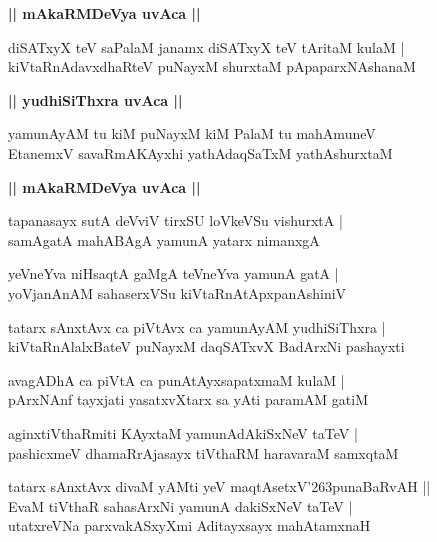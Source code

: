 \documentclass[twoside,12pt,openright]{book}
\def\S{\char'263}
\newcounter{shloka}[chapter]
\def\uvaca#1{\centerline{{\large\textbf{#1}}}}
\begin{document}
\uvaca{|| mAkaRMDeVya uvAca ||}

\begin{shloka}
diSATxyX teV saPalaM janamx diSATxyX teV tAritaM kulaM |\\
kiVtaRnAdavxdhaRteV puNayxM shurxtaM pApaparxNAshanaM 
\end{shloka}

\uvaca{|| yudhiSiThxra uvAca ||}

\begin{shloka}
yamunAyAM tu kiM puNayxM kiM PalaM tu mahAmuneV \\
EtanemxV savaRmAKAyxhi yathAdaqSaTxM yathAshurxtaM 
\end{shloka}

\uvaca{ || mAkaRMDeVya uvAca ||}

\begin{shloka}
tapanasayx sutA deVviV tirxSU loVkeVSu vishurxtA |\\
samAgatA mahABAgA yamunA yatarx nimanxgA 
\end{shloka}

\begin{shloka}
yeVneYva niHsaqtA gaMgA teVneYva yamunA gatA |\\
yoVjanAnAM sahaserxVSu kiVtaRnAtApxpanAshiniV 
\end{shloka}

\begin{shloka}
tatarx sAnxtAvx ca piVtAvx ca yamunAyAM yudhiSiThxra |\\
kiVtaRnAlalxBateV puNayxM daqSATxvX BadArxNi pashayxti
\end{shloka}

\begin{shloka}
avagADhA ca piVtA ca punAtAyxsapatxmaM kulaM |\\
pArxNAnf tayxjati yasatxvXtarx sa yAti paramAM gatiM 
\end{shloka}

\begin{shloka}
aginxtiVthaRmiti KAyxtaM yamunAdAkiSxNeV taTeV |\\
pashicxmeV dhamaRrAjasayx tiVthaRM haravaraM samxqtaM 
\end{shloka}

\begin{shloka}
tatarx sAnxtAvx divaM yAMti yeV maqtAsetxV\S punaBaRvAH ||\\
EvaM tiVthaR sahasArxNi yamunA dakiSxNeV taTeV |\\
utatxreVNa parxvakASxyXmi Aditayxsayx mahAtamxnaH 
\end{shloka}
\end{document}
